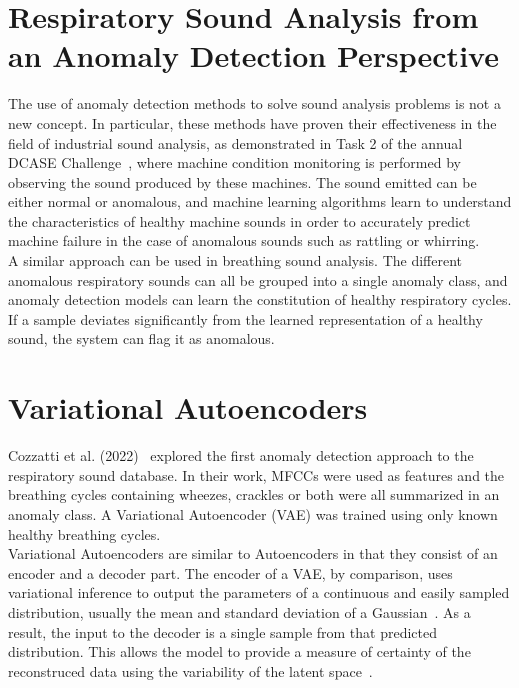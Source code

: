 \section{Respiratory Sound Analysis from an Anomaly Detection Perspective}
The use of anomaly detection methods to solve sound analysis problems is not a new concept. In particular, these methods have proven their effectiveness in the field of industrial sound analysis, as demonstrated in Task 2 of the annual DCASE Challenge~\cite{dcaseDCASE2023Challenge}, where machine condition monitoring is performed by observing the sound produced by these machines. The sound emitted can be either normal or anomalous, and machine learning algorithms learn to understand the characteristics of healthy machine sounds in order to accurately predict machine failure in the case of anomalous sounds such as rattling or whirring.\\
A similar approach can be used in breathing sound analysis. The different anomalous respiratory sounds can all be grouped into a single anomaly class, and anomaly detection models can learn the constitution of healthy respiratory cycles. If a sample deviates significantly from the learned representation of a healthy sound, the system can flag it as anomalous.


\section{Variational Autoencoders}
Cozzatti et al. (2022)~\cite{cozzatti2022variational} explored the first anomaly detection approach to the respiratory sound database. In their work, MFCCs were used as features and the breathing cycles containing wheezes, crackles or both were all summarized in an anomaly class. A Variational Autoencoder (VAE) was trained using only known healthy breathing cycles.\\
Variational Autoencoders are similar to Autoencoders in that they consist of an encoder and a decoder part. The encoder of a VAE, by comparison, uses variational inference to output the parameters of a continuous and easily sampled distribution, usually the mean and standard deviation of a  Gaussian~\cite{cozzatti2022variational}. As a result, the input to the decoder is a single sample from that predicted distribution. This allows the model to provide a measure of certainty of the reconstruced data using the variability of the latent space~\cite{an2015variational}.\\


